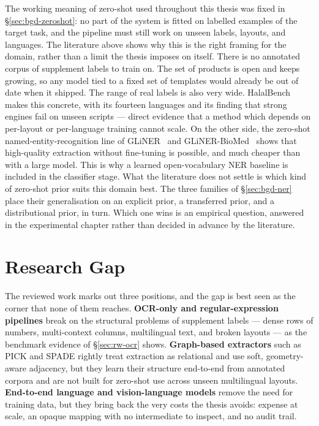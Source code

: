The working meaning of zero-shot used throughout this thesis was fixed in \S\ref{sec:bgd-zeroshot}: no part of the system is fitted on labelled examples of the target task, and the pipeline must still work on unseen labels, layouts, and languages. The literature above shows why this is the right framing for the domain, rather than a limit the thesis imposes on itself. There is no annotated corpus of supplement labels to train on. The set of products is open and keeps growing, so any model tied to a fixed set of templates would already be out of date when it shipped. The range of real labels is also very wide. HalalBench~\cite{arief2026halalbench} makes this concrete, with its fourteen languages and its finding that strong engines fail on unseen scripts --- direct evidence that a method which depends on per-layout or per-language training cannot scale. On the other side, the zero-shot named-entity-recognition line of GLiNER~\cite{zaratiana2023gliner} and GLiNER-BioMed~\cite{yazdani2025glinerbiomed} shows that high-quality extraction without fine-tuning is possible, and much cheaper than with a large model. This is why a learned open-vocabulary NER baseline is included in the classifier stage. What the literature does not settle is which kind of zero-shot prior suits this domain best. The three families of \S\ref{sec:bgd-ner} place their generalisation on an explicit prior, a transferred prior, and a distributional prior, in turn. Which one wins is an empirical question, answered in the experimental chapter rather than decided in advance by the literature.

\section{Research Gap}\label{sec:rw-gap}

The reviewed work marks out three positions, and the gap is best seen as the corner that none of them reaches. \textbf{OCR-only and regular-expression pipelines} break on the structural problems of supplement labels --- dense rows of numbers, multi-context columns, multilingual text, and broken layouts --- as the benchmark evidence of \S\ref{sec:rw-ocr} shows. \textbf{Graph-based extractors} such as PICK and SPADE rightly treat extraction as relational and use soft, geometry-aware adjacency, but they learn their structure end-to-end from annotated corpora and are not built for zero-shot use across unseen multilingual layouts. \textbf{End-to-end language and vision-language models} remove the need for training data, but they bring back the very costs the thesis avoids: expense at scale, an opaque mapping with no intermediate to inspect, and no audit trail.

